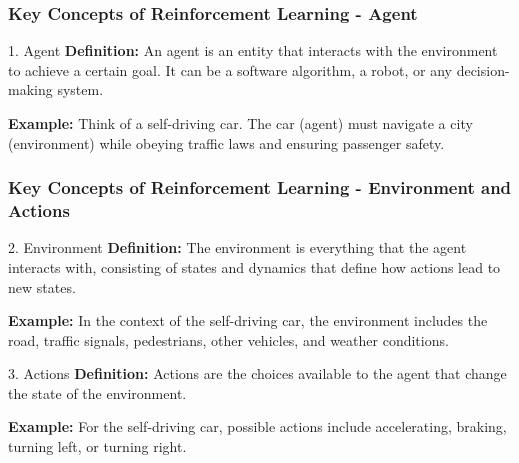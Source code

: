 \documentclass{beamer}
\begin{document}
\begin{frame}[fragile]
    \frametitle{Key Concepts of Reinforcement Learning - Agent}
    \begin{block}{1. Agent}
        \textbf{Definition:} An agent is an entity that interacts with the environment to achieve a certain goal. It can be a software algorithm, a robot, or any decision-making system.
    \end{block}
    \begin{example} 
        \textbf{Example:} Think of a self-driving car. The car (agent) must navigate a city (environment) while obeying traffic laws and ensuring passenger safety.
    \end{example}
\end{frame}

\begin{frame}[fragile]
    \frametitle{Key Concepts of Reinforcement Learning - Environment and Actions}
    \begin{block}{2. Environment}
        \textbf{Definition:} The environment is everything that the agent interacts with, consisting of states and dynamics that define how actions lead to new states.
    \end{block}
    \begin{example}
        \textbf{Example:} In the context of the self-driving car, the environment includes the road, traffic signals, pedestrians, other vehicles, and weather conditions.
    \end{example}
    
    \begin{block}{3. Actions}
        \textbf{Definition:} Actions are the choices available to the agent that change the state of the environment. 
    \end{block}
    \begin{example}
        \textbf{Example:} For the self-driving car, possible actions include accelerating, braking, turning left, or turning right.
    \end{example}
\end{frame}
\end{document}
